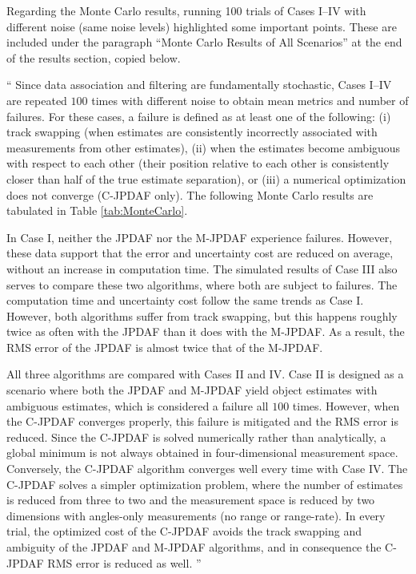\documentclass[11pt]{article}
\newenvironment{correction}{\begin{list}{}{\setlength{\leftmargin}{1cm}\setlength{\rightmargin}{1cm}}\vspace{\parsep}\item[]``}{''\end{list}}
\begin{document}
\begin{itemize}
Regarding the Monte Carlo results, running 100 trials of Cases I--IV with different noise (same noise levels) highlighted some important points. These are included under the paragraph ``Monte Carlo Results of All Scenarios'' at the end of the results section, copied below.

\begin{correction}
Since data association and filtering are fundamentally stochastic, Cases I--IV are repeated $100$ times with different noise to obtain mean metrics and number of failures.
For these cases, a failure is defined as at least one of the following: (i) track swapping (when estimates are consistently incorrectly associated with measurements from other estimates), (ii) when the estimates become ambiguous with respect to each other (their position relative to each other is consistently closer than half of the true estimate separation), or (iii) a numerical optimization does not converge (C-JPDAF only).
The following Monte Carlo results are tabulated in Table \ref{tab:MonteCarlo}.

In Case I, neither the JPDAF nor the M-JPDAF experience failures.
However, these data support that the error and uncertainty cost are reduced on average, without an increase in computation time.
The simulated results of Case III also serves to compare these two algorithms, where both are subject to failures.
The computation time and uncertainty cost follow the same trends as Case I.
However, both algorithms suffer from track swapping, but this happens roughly twice as often with the JPDAF than it does with the M-JPDAF. As a result, the RMS error of the JPDAF is almost twice that of the M-JPDAF.

All three algorithms are compared with Cases II and IV. Case II is designed as a scenario where both the JPDAF and M-JPDAF yield object estimates with ambiguous estimates, which is considered a failure all $100$ times.
However, when the C-JPDAF converges properly, this failure is mitigated and the RMS error is reduced.
Since the C-JPDAF is solved numerically rather than analytically, a global minimum is not always obtained in four-dimensional measurement space.
Conversely, the C-JPDAF algorithm converges well every time with Case IV. The C-JPDAF solves a simpler optimization problem, where the number of estimates is reduced from three to two and the measurement space is reduced by two dimensions with angles-only measurements (no range or range-rate).
In every trial, the optimized cost of the C-JPDAF avoids the track swapping and ambiguity of the JPDAF and M-JPDAF algorithms, and in consequence the C-JPDAF RMS error is reduced as well.
\end{correction}


\end{itemize}
\end{document}
